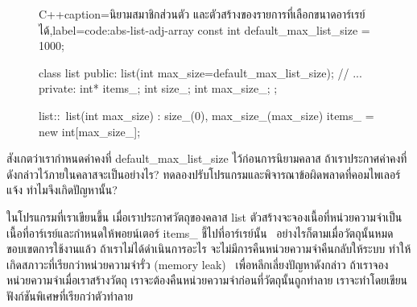 \begin{figure}
\latintext
\begin{codelist}{C++}{caption={\thaitext นิยาม{\wbr}สมาชิก{\wbr}ส่วนตัว และ{\wbr}ตัว{\wbr}สร้าง{\wbr}ของ{\wbr}รายการ{\wbr}ที่{\wbr}เลือก{\wbr}ขนาด{\wbr}อาร์เรย์{\wbr}ได้\latintext},label=code:abs-list-adj-array}
const int default_max_list_size = 1000;

class list {
public:
  list(int max_size=default_max_list_size);
  // ... 
private:
  int* items_;
  int size_;
  int max_size_;
};

list::~list(int max_size)
  : size_(0), max_size_(max_size) 
{
  items_ = new int[max_size_];
}
\end{codelist}
\thaitext
\end{figure}

\begin{quiz}{}
สังเกต{\wbr}ว่า{\wbr}เรา{\wbr}กำหนด{\wbr}ค่าคงที่ {\ct default\_max\_list\_size} ไว้{\wbr}ก่อน{\wbr}การ{\wbr}นิยาม{\wbr}ค{\wbr}ลา{\wbr}ส
ถ้า{\wbr}เรา{\wbr}ประกาศ{\wbr}ค่าคงที่{\wbr}ดังกล่าว{\wbr}ไว้{\wbr}ภายใน{\wbr}ค{\wbr}ลา{\wbr}ส{\wbr}จะ{\wbr}เป็น{\wbr}อย่างไร?
ทดลอง{\wbr}ปรับ{\wbr}โปรแกรม{\wbr}และ{\wbr}พิจารณา{\wbr}ข้อผิดพลาด{\wbr}ที่{\wbr}คอม{\wbr}ไพ{\wbr}เลอร์{\wbr}แจ้ง ทำไม{\wbr}จึง{\wbr}เกิด{\wbr}ปัญหา{\wbr}นั้น?
\end{quiz}

ใน{\wbr}โปรแกรม{\wbr}ที่{\wbr}เรา{\wbr}เขียน{\wbr}ขึ้น เมื่อ{\wbr}เรา{\wbr}ประกาศ{\wbr}วัตถุ{\wbr}ของ{\wbr}ค{\wbr}ลา{\wbr}ส {\ct list}
ตัว{\wbr}สร้าง{\wbr}จะ{\wbr}จอง{\wbr}เนื้อที่{\wbr}หน่วยความจำ{\wbr}เป็น{\wbr}เนื้อที่{\wbr}อาร์เรย์{\wbr}และ{\wbr}กำหนด{\wbr}ให้{\wbr}พอยน์เตอร์ {\ct items\_}
ชี้{\wbr}ไป{\wbr}ที่{\wbr}อาร์เรย์{\wbr}นั้น \ อย่างไรก็ตาม{\wbr}เมื่อ{\wbr}วัตถุ{\wbr}นั้น{\wbr}หมด{\wbr}ขอบเขต{\wbr}การ{\wbr}ใช้{\wbr}งาน{\wbr}แล้ว{\wbr}
ถ้า{\wbr}เรา{\wbr}ไม่{\wbr}ได้{\wbr}ดำเนินการ{\wbr}อะไร จะ{\wbr}ไม่{\wbr}มี{\wbr}การ{\wbr}คืน{\wbr}หน่วยความจำ{\wbr}คืน{\wbr}กลับ{\wbr}ให้{\wbr}ระบบ{\wbr}
ทำ{\wbr}ให้{\wbr}เกิด{\wbr}สภาวะ{\wbr}ที่{\wbr}เรียก{\wbr}ว่า{\wbr}หน่วยความจำ{\wbr}รั่ว (memory leak) \ เพื่อ{\wbr}หลีกเลี่ยง{\wbr}ปัญหา{\wbr}ดังกล่าว{\wbr}
ถ้า{\wbr}เรา{\wbr}จอง{\wbr}หน่วยความจำ{\wbr}เมื่อ{\wbr}เรา{\wbr}สร้าง{\wbr}วัตถุ เรา{\wbr}จะ{\wbr}ต้อง{\wbr}คืน{\wbr}หน่วยความจำ{\wbr}ก่อน{\wbr}ที่{\wbr}วัตถุ{\wbr}นั้น{\wbr}ถูก{\wbr}ทำลาย{\wbr}
เรา{\wbr}จะ{\wbr}ทำ{\wbr}โดย{\wbr}เขียน{\wbr}ฟังก์ชัน{\wbr}พิเศษ{\wbr}ที่{\wbr}เรียก{\wbr}ว่า{\wbr}ตัว{\wbr}ทำลาย{\wbr}

